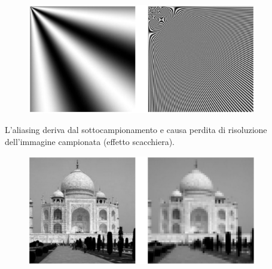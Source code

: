 \begin{figure}[H]
    \centering
    \includegraphics[width=10cm, keepaspectratio]{capitoli/immagini/imgs/aliasing_componenti_spettrali.jpg}
\end{figure}

L'aliasing deriva dal sottocampionamento e causa perdita di risoluzione
dell'immagine campionata (effetto scacchiera).

\begin{figure}[H]
    \centering
    \includegraphics[width=10cm, keepaspectratio]{capitoli/immagini/imgs/aliasing_tajmahal.jpg}
\end{figure}

